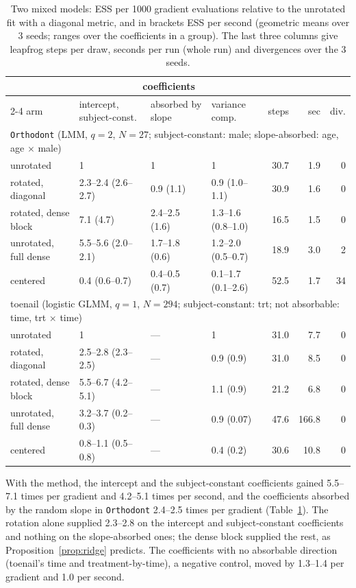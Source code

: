 \begin{table}[t]
\centering
\caption{Two mixed models: ESS per 1000 gradient evaluations relative to
the unrotated fit with a diagonal metric, and in brackets ESS per second
(geometric means over 3 seeds; ranges over the coefficients in a group).
The last three columns give leapfrog steps per draw, seconds per run
(whole run) and divergences over the 3 seeds.}
\label{tab:gen}
\footnotesize
\setlength{\tabcolsep}{4pt}
\begin{tabular}{l lll rrr}
\toprule
& \multicolumn{3}{c}{coefficients} & & & \\
\cmidrule(lr){2-4}
arm & intercept, subject-const. & absorbed by slope & variance comp. & steps & sec & div. \\
\midrule
\multicolumn{7}{l}{\texttt{Orthodont} (LMM, $q = 2$, $N = 27$; subject-constant: male; slope-absorbed: age, age $\times$ male)} \\
unrotated           & 1 & 1 & 1 & 30.7 & 1.9 & 0 \\
rotated, diagonal   & 2.3--2.4 (2.6--2.7) & 0.9 (1.1)    & 0.9 (1.0--1.1)  & 30.9 & 1.6 & 0 \\
rotated, dense block & 7.1 (4.7)       & 2.4--2.5 (1.6)  & 1.3--1.6 (0.8--1.0) & 16.5 & 1.5 & 0 \\
unrotated, full dense & 5.5--5.6 (2.0--2.1) & 1.7--1.8 (0.6) & 1.2--2.0 (0.5--0.7) & 18.9 & 3.0 & 2 \\
centered             & 0.4 (0.6--0.7)   & 0.4--0.5 (0.7)  & 0.1--1.7 (0.1--2.6) & 52.5 & 1.7 & 34 \\
\midrule
\multicolumn{7}{l}{toenail (logistic GLMM, $q = 1$, $N = 294$; subject-constant: trt; not absorbable: time, trt $\times$ time)} \\
unrotated           & 1 & --- & 1 & 31.0 & 7.7 & 0 \\
rotated, diagonal   & 2.5--2.8 (2.3--2.5) & --- & 0.9 (0.9) & 31.0 & 8.5 & 0 \\
rotated, dense block & 5.5--6.7 (4.2--5.1) & --- & 1.1 (0.9) & 21.2 & 6.8 & 0 \\
unrotated, full dense & 3.2--3.7 (0.2--0.3) & --- & 0.9 (0.07) & 47.6 & 166.8 & 0 \\
centered             & 0.8--1.1 (0.5--0.8) & --- & 0.4 (0.2) & 30.6 & 10.8 & 0 \\
\bottomrule
\end{tabular}
\end{table}

With the method, the intercept and the subject-constant coefficients
gained 5.5--7.1 times per gradient and 4.2--5.1 times per second, and the
coefficients absorbed by the random slope in \texttt{Orthodont} 2.4--2.5
times per gradient (Table~\ref{tab:gen}). The rotation alone supplied
2.3--2.8 on the intercept and subject-constant coefficients and nothing on
the slope-absorbed ones; the dense block supplied the rest, as
Proposition~\ref{prop:ridge} predicts. The coefficients with no
absorbable direction (toenail's time and treatment-by-time), a negative
control, moved by 1.3--1.4 per gradient and 1.0 per second.

